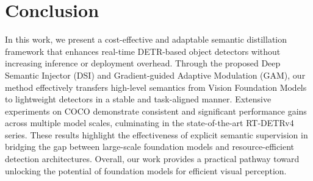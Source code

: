 \section{Conclusion}
In this work, we present a cost-effective and adaptable semantic distillation framework that enhances real-time DETR-based object detectors without increasing inference or deployment overhead.
Through the proposed Deep Semantic Injector (DSI) and Gradient-guided Adaptive Modulation (GAM), our method effectively transfers high-level semantics from Vision Foundation Models to lightweight detectors in a stable and task-aligned manner.
Extensive experiments on COCO demonstrate consistent and significant performance gains across multiple model scales, culminating in the state-of-the-art RT-DETRv4 series.
These results highlight the effectiveness of explicit semantic supervision in bridging the gap between large-scale foundation models and resource-efficient detection architectures.
Overall, our work provides a practical pathway toward unlocking the potential of foundation models for efficient visual perception.